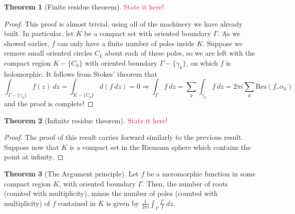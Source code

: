 \documentclass[aps,pra,showpacs,notitlepage,onecolumn,superscriptaddress,nofootinbib]{revtex4-1}
\newcommand{\pop}[1]{\textcolor{crimson}{#1}}
\theoremstyle{definition}
\newtheorem{theorem}{Theorem}[section]
\begin{document}
\begin{theorem}[Finite residue theorem]
  \pop{State it here!}
\end{theorem}

\begin{proof}
  This proof is almost trivial, using all of the machinery we have already built. In particular, let $K$ be a compact set with oriented boundary $\Gamma$.
  As we showed earlier, $f$ can only have a finite number of poles inside $K$. Suppose we remove small oriented circles $C_k$ about each of these poles, so
  we are left with the compact region $K - \{C_k\}$ with oriented boundary $\Gamma - \{\gamma_k\}$, on which $f$ is holomorphic. It follows from Stokes' theorem that
  \begin{equation}
    \displaystyle\int_{\Gamma - \{\gamma_k\}} f(z) \ dz = \displaystyle\int_{K - \{C_k\}} d(f \ dz)  = 0 \Longrightarrow \displaystyle\int_{\Gamma} f \ dz = \displaystyle\sum_{k} \displaystyle\int_{\gamma_k} f \ dz = 2 \pi i \displaystyle\sum_{k} \text{Res}(f, \alpha_k)
  \end{equation}
  and the proof is complete!
\end{proof}

\begin{theorem}[Infinite residue theorem]
  \pop{State it here!}
\end{theorem}

\begin{proof}
The proof of this result carries forward similarly to the previous result. Suppose now that $K$ is a compact set in the Riemann sphere which contains the point at infinity.
  \end{proof}

\begin{theorem}[The Argument principle]
  Let $f$ be a meromorphic function in some compact region $K$, with oriented boundary $\Gamma$. Then, the number of roots (counted with multiplicity), minus the number of poles (counted
  with multiplicity) of $f$ contained in $K$ is given by $\frac{1}{2\pi i} \int_{\Gamma} \frac{f'}{f} \ dz$.
\end{theorem}
\end{document}
